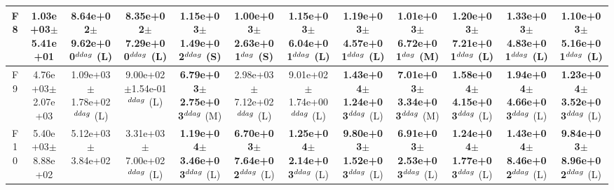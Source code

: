 \begin{table}[!t]
\begin{tabular}{c|ccccccccccc}
F8  & 1.03e+03$\pm$5.41e+01  & 8.64e+02$\pm$9.62e+00$^{\\ddag}$ (L)  & 8.35e+02$\pm$7.29e+00$^{\\ddag}$ (L)  & \textbf{1.15e+03$\pm$1.49e+02}$^{\\ddag}$ (S)  & 1.00e+03$\pm$2.63e+01$^{\\dag}$ (S)  & \textbf{1.15e+03$\pm$6.04e+01}$^{\\ddag}$ (L)  & \textbf{1.19e+03$\pm$4.57e+01}$^{\\ddag}$ (L)  & 1.01e+03$\pm$6.72e+01$^{\\dag}$ (M)  & \textbf{1.20e+03$\pm$7.21e+01}$^{\\ddag}$ (L)  & \textbf{1.33e+03$\pm$4.83e+01}$^{\\ddag}$ (L)  & \textbf{1.10e+03$\pm$5.16e+01}$^{\\ddag}$ (L) \\ \hline
F9  & 4.76e+03$\pm$2.07e+03  & 1.09e+03$\pm$1.78e+02$^{\\ddag}$ (L)  & 9.00e+02$\pm$1.54e-01$^{\\ddag}$ (L)  & \textbf{6.79e+03$\pm$2.75e+03}$^{\\ddag}$ (M)  & 2.98e+03$\pm$7.12e+02$^{\\ddag}$ (L)  & 9.01e+02$\pm$1.74e+00$^{\\ddag}$ (L)  & \textbf{1.43e+04$\pm$1.24e+03}$^{\\ddag}$ (L)  & \textbf{7.01e+03$\pm$3.34e+03}$^{\\ddag}$ (M)  & \textbf{1.58e+04$\pm$4.15e+03}$^{\\ddag}$ (L)  & \textbf{1.94e+04$\pm$4.66e+03}$^{\\ddag}$ (L)  & \textbf{1.23e+04$\pm$3.52e+03}$^{\\ddag}$ (L) \\ \hline
F10  & 5.40e+03$\pm$8.88e+02  & 5.12e+03$\pm$3.84e+02   & 3.31e+03$\pm$7.00e+02$^{\\ddag}$ (L)  & \textbf{1.19e+04$\pm$3.46e+03}$^{\\ddag}$ (L)  & \textbf{6.70e+03$\pm$7.64e+02}$^{\\ddag}$ (L)  & \textbf{1.25e+04$\pm$2.14e+03}$^{\\ddag}$ (L)  & \textbf{9.80e+03$\pm$1.52e+03}$^{\\ddag}$ (L)  & \textbf{6.91e+03$\pm$2.53e+03}$^{\\ddag}$ (L)  & \textbf{1.24e+04$\pm$1.77e+03}$^{\\ddag}$ (L)  & \textbf{1.43e+04$\pm$8.46e+02}$^{\\ddag}$ (L)  & \textbf{9.84e+03$\pm$8.96e+02}$^{\\ddag}$ (L) \\ \hline

\end{tabular}
\end{table}
